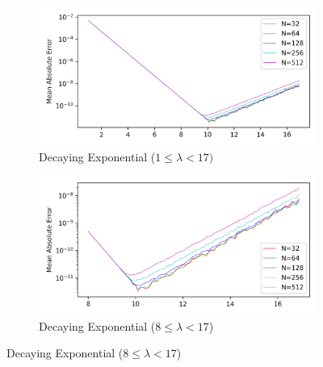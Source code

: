 \documentclass[a4paper]{report}
\begin{document}
\begin{figure}[H]
    \begin{subfigure}{.45\linewidth}
      \includegraphics[width=\linewidth]{images/abate_whitt/decaying_exp.png}
      \caption{Decaying Exponential ($1 \leq \lambda < 17)$}
    \end{subfigure}\hfill
    \begin{subfigure}{.45\linewidth}
      \includegraphics[width=\linewidth]{images/abate_whitt/decaying_exp_zoomed.png}
      \caption{Decaying Exponential ($8 \leq \lambda < 17$)}
    \end{subfigure}
    
    \medskip
    

\end{figure}
\end{document}
